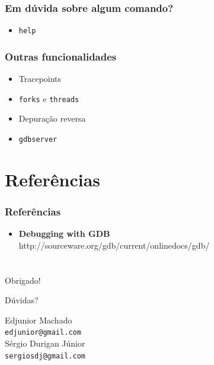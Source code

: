 \documentclass[xcolor=pdftex,dvipsnames,table,t]{beamer}
\begin{document}
\begin{frame}
	\frametitle{Em dúvida sobre algum comando?}
	  \begin{itemize}
	    \item \texttt{help}
	  \end{itemize}
\end{frame}

\begin{frame}
	\frametitle{Outras funcionalidades}
	  \begin{itemize}
	    \item Tracepoints
	    \item \texttt{forks} e \texttt{threads}
	    \item Depuração reversa
	    \item \texttt{gdbserver}
	  \end{itemize}
\end{frame}

\section{Referências}
\begin{frame}
       \frametitle{Referências}
        \begin{center}
        \begin{itemize}
		\item \textbf{Debugging with GDB} \\
		http://sourceware.org/gdb/current/onlinedocs/gdb/
	\end{itemize}
        \end{center}
\end{frame}

\section{}
\begin{frame}
	\begin{center}
	\LARGE
	\alert{Obrigado!}

	Dúvidas?


	\vspace{2\baselineskip}

	\small
	Edjunior Machado \\
	{\tt edjunior@gmail.com} \\
	\vspace{1\baselineskip}
	Sérgio Durigan Júnior \\
	{\tt sergiosdj@gmail.com}
	\end{center}
\end{frame}
\end{document}
